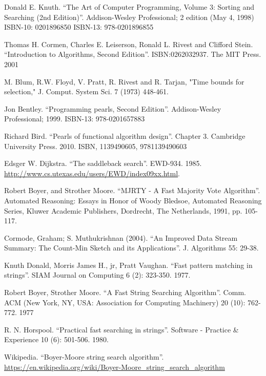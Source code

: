 \documentclass[b5paper]{ctexart}
\begin{document}
\begin{thebibliography}{99}

Donald E. Knuth. ``The Art of Computer Programming, Volume 3: Sorting and Searching (2nd Edition)''. Addison-Wesley Professional; 2 edition (May 4, 1998) ISBN-10: 0201896850 ISBN-13: 978-0201896855

Thomas H. Cormen, Charles E. Leiserson, Ronald L. Rivest and Clifford Stein.
``Introduction to Algorithms, Second Edition''. ISBN:0262032937. The MIT Press. 2001

M. Blum, R.W. Floyd, V. Pratt, R. Rivest and R. Tarjan, "Time bounds for selection," J. Comput. System Sci. 7 (1973) 448-461.

Jon Bentley. ``Programming pearls, Second Edition''. Addison-Wesley Professional; 1999. ISBN-13: 978-0201657883

Richard Bird. ``Pearls of functional algorithm design''. Chapter 3. Cambridge University Press. 2010. ISBN, 1139490605, 9781139490603

Edsger W. Dijkstra. ``The saddleback search''. EWD-934. 1985. \url{http://www.cs.utexas.edu/users/EWD/index09xx.html}.

Robert Boyer, and Strother Moore. ``MJRTY - A Fast Majority Vote Algorithm''. Automated Reasoning: Essays in Honor of Woody Bledsoe, Automated Reasoning Series, Kluwer Academic Publishers, Dordrecht, The Netherlands, 1991, pp. 105-117.

Cormode, Graham; S. Muthukrishnan (2004). ``An Improved Data Stream Summary: The Count-Min Sketch and its Applications''. J. Algorithms 55: 29-38.

Knuth Donald, Morris James H., jr, Pratt Vaughan. ``Fast pattern matching in strings''. SIAM Journal on Computing 6 (2): 323-350. 1977.

Robert Boyer, Strother Moore. ``A Fast String Searching Algorithm''. Comm. ACM (New York, NY, USA: Association for Computing Machinery) 20 (10): 762-772. 1977

R. N. Horspool. ``Practical fast searching in strings''. Software - Practice \& Experience 10 (6): 501-506. 1980.

Wikipedia. ``Boyer-Moore string search algorithm''. \url{https://en.wikipedia.org/wiki/Boyer-Moore_string_search_algorithm}


\end{thebibliography}
\end{document}
